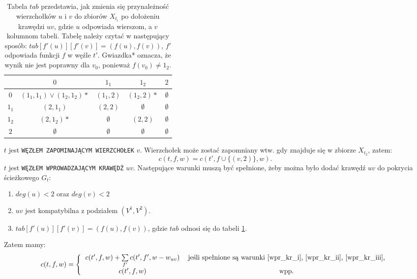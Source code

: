 \documentclass[12pt, oneside]{report}
\begin{document}
\begin{table}
\centering
\begin{tabular}{c|c|c|c|c}
 & $0$ & $1_1$ & $1_2$ & $2$ \\
\hline
$0$ & $(1_1,1_1) \vee (1_2,1_2)*$ & $(1_1,2)$ & $(1_2,2)*$ & $\emptyset$ \\
\hline
$1_1$ & $(2,1_1)$ & $(2,2)$ & $\emptyset$ & $\emptyset$ \\
\hline
$1_2$ & $(2,1_2)*$ & $\emptyset$ & $(2,2)$ & $\emptyset$ \\
\hline
$2$ & $\emptyset$ & $\emptyset$ & $\emptyset$ & $\emptyset$ \\
\end{tabular}
\caption{Tabela $tab$ przedstawia, jak zmienia się przynależność wierzchołków $u$ i $v$ do zbiorów $X_{t_i}$ po dołożeniu krawędzi $uv$, gdzie $u$ odpowiada wierszom, a $v$ kolumnom tabeli. Tabelę należy czytać w następujący sposób: $tab[f'(u)][f'(v)] = (f(u), f(v))$, $f'$ odpowiada funkcji $f$ w węźle $t'$. Gwiazdka* oznacza, że wynik nie jest poprawny dla $v_0$, ponieważ $f(v_0) \neq 1_2$.}
\label{add_edge_table}
\end{table}
\noindent$t$ jest \texttt{WĘZŁEM ZAPOMINAJĄCYM WIERZCHOŁEK} $v$. Wierzchołek może zostać zapomniany wtw. gdy znajduje się w zbiorze $X_{t_2}$, zatem:
$$c(t,f,w) = c(t',f \cup \{(v,2)\},w).$$
\newline
$t$ jest \texttt{WĘZŁEM WPROWADZAJĄCYM KRAWĘDŹ} $uv$. Następujące warunki muszą być spełnione, żeby można było dodać krawędź $uv$ do pokrycia ścieżkowego $G_t$:
\begin{enumerate}[label=(\roman*)]
\item \label{wpr_kr_i}$deg(u) < 2$ oraz $deg(v) < 2$
\item \label{wpr_kr_ii}$uv$ jest kompatybilna z podziałem $(V^1, V^2)$.
\item \label{wpr_kr_iii}$tab[f'(u)][f'(v)] = (f(u),f(v))$, gdzie $tab$ odnosi się do tabeli \ref{add_edge_table}.  
\end{enumerate}
Zatem mamy:
\[
c(t,f,w) =  
\left \{
  \begin{tabular}{ccc}
  $c(t',f,w) + \sum \limits_{f'} c(t',f',w - w_{uv})$ & jeśli spełnione są warunki \ref{wpr_kr_i}, \ref{wpr_kr_ii}, \ref{wpr_kr_iii},\\
  $c(t',f,w)$ &  wpp.
  \end{tabular}
\right. 
\]
\end{document}
